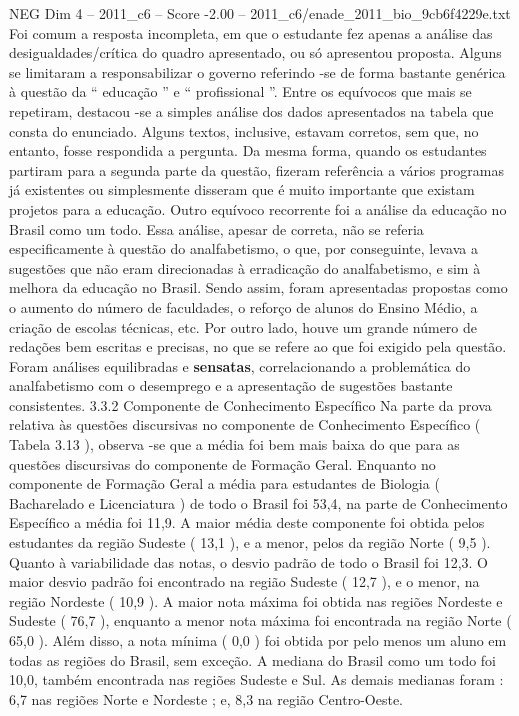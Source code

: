 \begin{textsample}{NEG Dim 4 – 2011\_c6 – Score -2.00 – 2011\_c6/enade\_2011\_bio\_9cb6f4229e.txt}
Foi comum a resposta incompleta, em que o estudante fez apenas a análise das desigualdades/crítica do quadro apresentado, ou só apresentou proposta.
Alguns se limitaram a responsabilizar o governo referindo -se de forma bastante genérica à questão da “ educação ” e “ profissional ”.
Entre os equívocos que mais se repetiram, destacou -se a simples análise dos dados apresentados na tabela que consta do enunciado.
Alguns textos, inclusive, estavam corretos, sem que, no entanto, fosse respondida a pergunta.
Da mesma forma, quando os estudantes partiram para a segunda parte da questão, fizeram referência a vários programas já existentes ou simplesmente disseram que é muito importante que existam projetos para a educação.
Outro equívoco recorrente foi a análise da educação no Brasil como um todo.
Essa análise, apesar de correta, não se referia especificamente à questão do analfabetismo, o que, por conseguinte, levava a sugestões que não eram direcionadas à erradicação do analfabetismo, e sim à melhora da educação no Brasil.
Sendo assim, foram apresentadas propostas como o aumento do número de faculdades, o reforço de alunos do Ensino Médio, a criação de escolas técnicas, etc.
Por outro lado, houve um grande número de redações bem escritas e precisas, no que se refere ao que foi exigido pela questão.
Foram análises equilibradas e \textbf{sensatas}, correlacionando a problemática do analfabetismo com o desemprego e a apresentação de sugestões bastante consistentes. 3.3.2 Componente de Conhecimento Específico Na parte da prova relativa às questões discursivas no componente de Conhecimento Específico ( Tabela 3.13 ), observa -se que a média foi bem mais baixa do que para as questões discursivas do componente de Formação Geral.
Enquanto no componente de Formação Geral a média para estudantes de Biologia ( Bacharelado e Licenciatura ) de todo o Brasil foi 53,4, na parte de Conhecimento Específico a média foi 11,9.
A maior média deste componente foi obtida pelos estudantes da região Sudeste ( 13,1 ), e a menor, pelos da região Norte ( 9,5 ).
Quanto à variabilidade das notas, o desvio padrão de todo o Brasil foi 12,3.
O maior desvio padrão foi encontrado na região Sudeste ( 12,7 ), e o menor, na região Nordeste ( 10,9 ).
A maior nota máxima foi obtida nas regiões Nordeste e Sudeste ( 76,7 ), enquanto a menor nota máxima foi encontrada na região Norte ( 65,0 ).
Além disso, a nota mínima ( 0,0 ) foi obtida por pelo menos um aluno em todas as regiões do Brasil, sem exceção.
A mediana do Brasil como um todo foi 10,0, também encontrada nas regiões Sudeste e Sul.
As demais medianas foram : 6,7 nas regiões Norte e Nordeste ; e, 8,3 na região Centro-Oeste.

\end{textsample}
